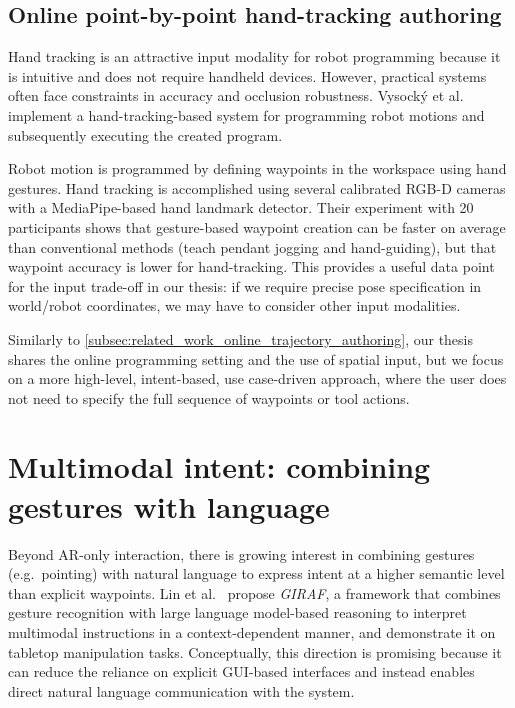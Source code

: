 \subsection{Online point-by-point hand-tracking authoring}

Hand tracking is an attractive input modality for robot programming because it is intuitive and does not require handheld devices. However, practical systems often face constraints in accuracy and occlusion robustness. Vysocký et al.~\cite{Vysocky2023} implement a hand-tracking-based system for programming robot motions and subsequently executing the created program.

Robot motion is programmed by defining waypoints in the workspace using hand gestures. Hand tracking is accomplished using several calibrated RGB-D cameras with a MediaPipe-based \cite{MediaPipeRoot} hand landmark detector. Their experiment with 20 participants shows that gesture-based waypoint creation can be faster on average than conventional methods (teach pendant jogging and hand-guiding), but that waypoint accuracy is lower for hand-tracking. This provides a useful data point for the input trade-off in our thesis: if we require precise pose specification in world/robot coordinates, we may have to consider other input modalities.

Similarly to \autoref{subsec:related_work_online_trajectory_authoring}, our thesis shares the online programming setting and the use of spatial input, but we focus on a more high-level, intent-based, use case-driven approach, where the user does not need to specify the full sequence of waypoints or tool actions.

\section{Multimodal intent: combining gestures with language}

Beyond AR-only interaction, there is growing interest in combining gestures (e.g.\ pointing) with natural language to express intent at a higher semantic level than explicit waypoints. Lin et al.~\cite{Lin2023} propose \emph{GIRAF}, a framework that combines gesture recognition with large language model-based reasoning to interpret multimodal instructions in a context-dependent manner, and demonstrate it on tabletop manipulation tasks. Conceptually, this direction is promising because it can reduce the reliance on explicit GUI-based interfaces and instead enables direct natural language communication with the system.

